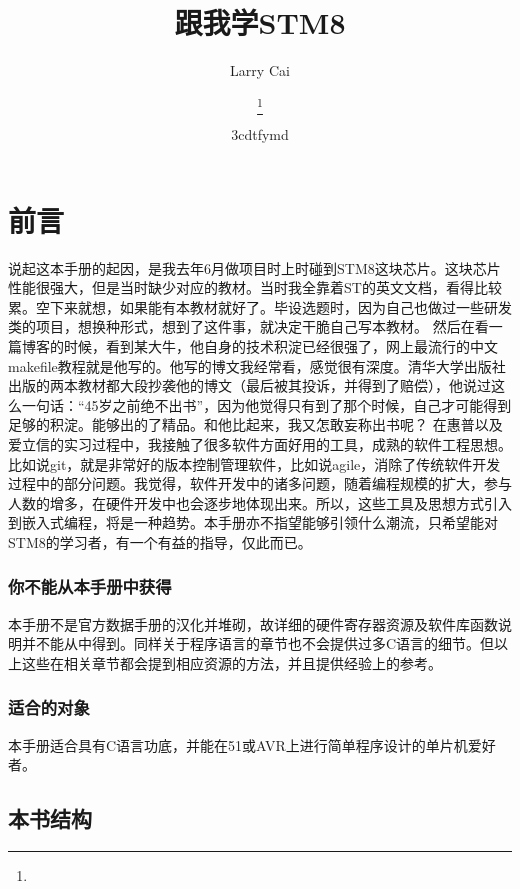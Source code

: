 \documentclass[a4paper]{book}
\title{{跟我学STM8}}
\author{Larry Cai}
\title{\huge{\savedtitle}}
\author{\textbf{\savedauthor}\thanks{}}
\date{\w3cdtfymd}
\begin{document}
\thispagestyle{empty}
\setcounter{tocdepth}{4}

\frontmatter
\chapter*{前言}

说起这本手册的起因，是我去年6月做项目时上时碰到STM8这块芯片。这块芯片性能很强大，但是当时缺少对应的教材。当时我全靠着ST的英文文档，看得比较累。空下来就想，如果能有本教材就好了。毕设选题时，因为自己也做过一些研发类的项目，想换种形式，想到了这件事，就决定干脆自己写本教材。 然后在看一篇博客的时候，看到某大牛，他自身的技术积淀已经很强了，网上最流行的中文makefile教程就是他写的。他写的博文我经常看，感觉很有深度。清华大学出版社出版的两本教材都大段抄袭他的博文（最后被其投诉，并得到了赔偿），他说过这么一句话：“45岁之前绝不出书”，因为他觉得只有到了那个时候，自己才可能得到足够的积淀。能够出的了精品。和他比起来，我又怎敢妄称出书呢？ 在惠普以及爱立信的实习过程中，我接触了很多软件方面好用的工具，成熟的软件工程思想。比如说git，就是非常好的版本控制管理软件，比如说agile，消除了传统软件开发过程中的部分问题。我觉得，软件开发中的诸多问题，随着编程规模的扩大，参与人数的增多，在硬件开发中也会逐步地体现出来。所以，这些工具及思想方式引入到嵌入式编程，将是一种趋势。本手册亦不指望能够引领什么潮流，只希望能对STM8的学习者，有一个有益的指导，仅此而已。

\subsection*{你不能从本手册中获得}

本手册不是官方数据手册的汉化并堆砌，故详细的硬件寄存器资源及软件库函数说明并不能从中得到。同样关于程序语言的章节也不会提供过多C语言的细节。但以上这些在相关章节都会提到相应资源的方法，并且提供经验上的参考。

\subsection*{适合的对象}

本手册适合具有C语言功底，并能在51或AVR上进行简单程序设计的单片机爱好者。

\section*{本书结构}
\end{document}
